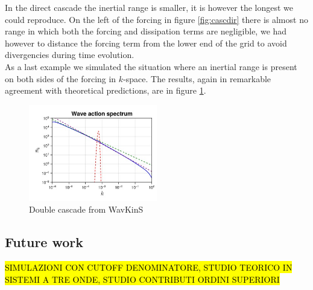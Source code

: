     In the direct cascade the inertial range is smaller, it is however the longest we could reproduce. On the left of the forcing in figure \ref{fig:cascdir} there is almost no range in which both the forcing and dissipation terms are negligible, we had however to distance the forcing term from the lower end of the grid to avoid divergencies during time evolution. \\
    As a last example we simulated the situation where an inertial range is present on both sides of the forcing in $k$-space. The results, again in remarkable agreement with theoretical predictions, are in figure \ref{fig:cascdouble}. 
    \begin{figure}[ht]
            \centering
            \includegraphics[width=0.5\textwidth]{images/double_cascade3.jpg}
            \vspace{-0.5cm}
            \caption{Double cascade from WavKinS}
            \label{fig:cascdouble}
    \end{figure}

    \clearpage
    \subsection{Future work}
    
    \hl{SIMULAZIONI CON CUTOFF DENOMINATORE, STUDIO TEORICO IN SISTEMI A TRE ONDE, STUDIO CONTRIBUTI ORDINI SUPERIORI}
    
